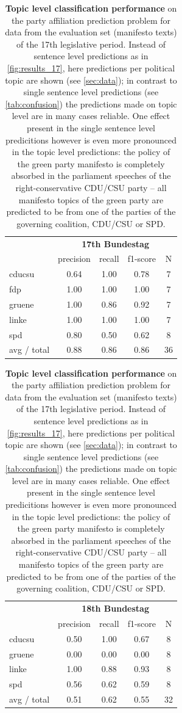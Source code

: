 \documentclass[runningheads,a4paper]{llncs}
\begin{document}
\begin{table}[t]
\begin{center}
\begin{tabular}{lcccc}
& \multicolumn{4}{c}{\bf 17th Bundestag} \\
    &         precision    &recall &  f1-score  & N  \\
    \hline
cducsu     &  0.64  &    1.00  &    0.78    &     7\\
       fdp    &   1.00    &  1.00    &  1.00    &     7\\
    gruene  &     1.00  &    0.86  &    0.92    &     7\\
     linke    &   1.00   &   1.00     & 1.00    &     7\\
       spd   &    0.80   &   0.50    &  0.62     &    8\\
    \hline
    \hline
    avg / total  &     0.88   &   0.86   &   0.86  &      36\\
\end{tabular}
\quad
\begin{tabular}{lcccc}
& \multicolumn{4}{c}{\bf 18th Bundestag} \\
    &         precision    &recall &  f1-score  & N  \\
    \hline
  cducsu     &  0.50   &   1.00  &    0.67     &    8\\
       gruene  &     0.00   &   0.00   &   0.00  &       8\\
      linke     &  1.00   &   0.88   &   0.93  &       8\\
        spd     &  0.56  &    0.62  &    0.59   &      8\\

avg / total   &    0.51 &     0.62   &   0.55   &     32\\
\end{tabular}
\end{center}
\caption{
\label{tab:results_topic}
{\bf Topic level classification performance} on the party affiliation prediction problem for data from the evaluation set (manifesto texts) of the 17th legislative period. Instead of sentence level predictions as in \autoref{fig:results_17}, here predictions per political topic are shown (see \autoref{sec:data}); in contrast to single sentence level predictions (see \autoref{tab:confusion}) the predictions made on topic level are in many cases reliable. One effect present in the single sentence level predicitions however is even more pronounced in the topic level predictions: the policy of the green party manifesto is completely absorbed in the parliament speeches of the right-conservative CDU/CSU party -- all manifesto topics of the green party are predicted to be from one of the parties of the governing coalition, CDU/CSU or SPD.}
\end{table}
\end{document}
